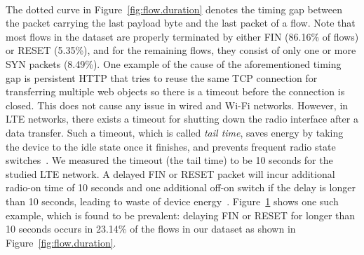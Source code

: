 \begin{figure}[t]
\centering
{}\\
\label{fig:delayed_fin}
\end{figure}

The dotted curve in Figure~\ref{fig:flow.duration} denotes the timing gap between the packet carrying the last payload byte and the last packet of a flow. Note that most flows in the dataset are properly terminated by either FIN (86.16\% of flows) or RESET (5.35\%), and for the remaining flows, they consist of only one or more SYN packets (8.49\%). One example of the cause of the aforementioned timing gap is persistent HTTP that tries to reuse the same TCP connection for transferring multiple web objects so there is a timeout before the connection is closed. This does not cause any issue in wired and Wi-Fi networks. However, in LTE networks, there exists a timeout for shutting down the radio interface after a data transfer. Such a timeout, which is called \emph{tail time}, saves energy by taking the device to the idle state once it finishes, and prevents frequent radio state switches~\cite{huang_mobisys12}. We measured the timeout (\ie the tail time) to be 10 seconds for the studied LTE network. A delayed FIN or RESET packet will incur additional radio-on time of 10 seconds and one additional off-on switch if the delay is longer than 10 seconds, leading to waste of device energy~\cite{mobisys.aro}. Figure~\ref{fig:delayed_fin} shows one such example, which is found to be prevalent: delaying FIN or RESET for longer than 10 seconds occurs in 23.14\% of the flows in our dataset as shown in Figure~\ref{fig:flow.duration}.


\begin{figure}[t]
\centering
{}\\
\label{fig:flow.rate}
\end{figure}


